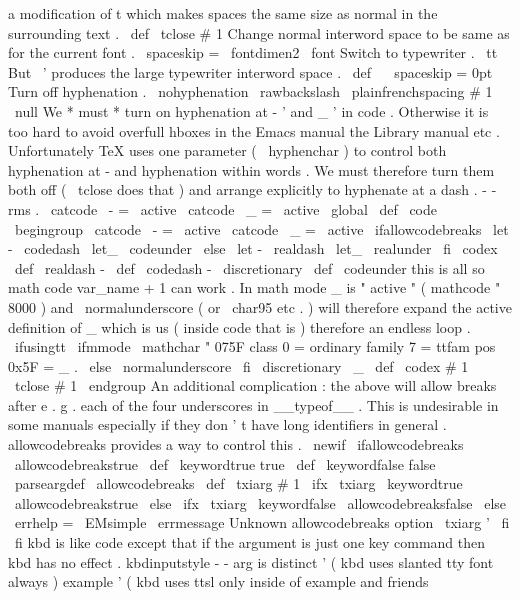 a
modification
of
t
%
which
makes
spaces
the
same
size
as
normal
in
the
surrounding
text
.
\
def
\
tclose
#
1
{
%
{
%
%
Change
normal
interword
space
to
be
same
as
for
the
current
font
.
\
spaceskip
=
\
fontdimen2
\
font
%
%
Switch
to
typewriter
.
\
tt
%
%
But
\
'
produces
the
large
typewriter
interword
space
.
\
def
\
{
{
\
spaceskip
=
0pt
{
}
}
}
%
%
%
Turn
off
hyphenation
.
\
nohyphenation
%
\
rawbackslash
\
plainfrenchspacing
#
1
%
}
%
\
null
}
%
We
*
must
*
turn
on
hyphenation
at
-
'
and
_
'
in
code
.
%
Otherwise
it
is
too
hard
to
avoid
overfull
hboxes
%
in
the
Emacs
manual
the
Library
manual
etc
.
%
Unfortunately
TeX
uses
one
parameter
(
\
hyphenchar
)
to
control
%
both
hyphenation
at
-
and
hyphenation
within
words
.
%
We
must
therefore
turn
them
both
off
(
\
tclose
does
that
)
%
and
arrange
explicitly
to
hyphenate
at
a
dash
.
%
-
-
rms
.
{
\
catcode
\
-
=
\
active
\
catcode
\
_
=
\
active
%
\
global
\
def
\
code
{
\
begingroup
\
catcode
\
-
=
\
active
\
catcode
\
_
=
\
active
\
ifallowcodebreaks
\
let
-
\
codedash
\
let_
\
codeunder
\
else
\
let
-
\
realdash
\
let_
\
realunder
\
fi
\
codex
}
}
\
def
\
realdash
{
-
}
\
def
\
codedash
{
-
\
discretionary
{
}
{
}
{
}
}
\
def
\
codeunder
{
%
%
this
is
all
so
math
{
code
{
var_name
}
+
1
}
can
work
.
In
math
mode
_
%
is
"
active
"
(
mathcode
"
8000
)
and
\
normalunderscore
(
or
\
char95
etc
.
)
%
will
therefore
expand
the
active
definition
of
_
which
is
us
%
(
inside
code
that
is
)
therefore
an
endless
loop
.
\
ifusingtt
{
\
ifmmode
\
mathchar
"
075F
%
class
0
=
ordinary
family
7
=
ttfam
pos
0x5F
=
_
.
\
else
\
normalunderscore
\
fi
\
discretionary
{
}
{
}
{
}
}
%
{
\
_
}
%
}
\
def
\
codex
#
1
{
\
tclose
{
#
1
}
\
endgroup
}
%
An
additional
complication
:
the
above
will
allow
breaks
after
e
.
g
.
%
each
of
the
four
underscores
in
__typeof__
.
This
is
undesirable
in
%
some
manuals
especially
if
they
don
'
t
have
long
identifiers
in
%
general
.
allowcodebreaks
provides
a
way
to
control
this
.
%
\
newif
\
ifallowcodebreaks
\
allowcodebreakstrue
\
def
\
keywordtrue
{
true
}
\
def
\
keywordfalse
{
false
}
\
parseargdef
\
allowcodebreaks
{
%
\
def
\
txiarg
{
#
1
}
%
\
ifx
\
txiarg
\
keywordtrue
\
allowcodebreakstrue
\
else
\
ifx
\
txiarg
\
keywordfalse
\
allowcodebreaksfalse
\
else
\
errhelp
=
\
EMsimple
\
errmessage
{
Unknown
allowcodebreaks
option
\
txiarg
'
}
%
\
fi
\
fi
}
%
kbd
is
like
code
except
that
if
the
argument
is
just
one
key
command
%
then
kbd
has
no
effect
.
%
kbdinputstyle
-
-
arg
is
distinct
'
(
kbd
uses
slanted
tty
font
always
)
%
example
'
(
kbd
uses
ttsl
only
inside
of
example
and
friends

